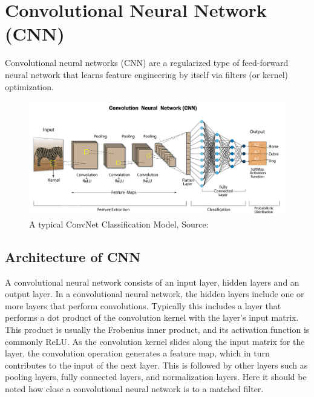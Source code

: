 \section{Convolutional Neural Network (CNN)}
    Convolutional neural networks (CNN) are a regularized type of feed-forward neural network that learns feature engineering by itself via filters (or kernel) optimization. \cite{convnet}
    \par\vspace{1em}
    
    \begin{figure}[h]
            \centering
            \includegraphics[width=1\textwidth]{graphics/chapter3/general cnn classification model.png}
            \caption{A typical ConvNet Classification Model, Source: \cite{convnet-fig}} 
            \label{fig:cnn1}
        \end{figure}
        
        
    \subsection{Architecture of CNN}
    A convolutional neural network consists of an input layer, hidden layers and an output layer. In a convolutional neural network, the hidden layers include one or more layers that perform convolutions. Typically this includes a layer that performs a dot product of the convolution kernel with the layer's input matrix. This product is usually the Frobenius inner product, and its activation function is commonly ReLU. As the convolution kernel slides along the input matrix for the layer, the convolution operation generates a feature map, which in turn contributes to the input of the next layer. This is followed by other layers such as pooling layers, fully connected layers, and normalization layers. Here it should be noted how close a convolutional neural network is to a matched filter\cite{convnet-1}.
